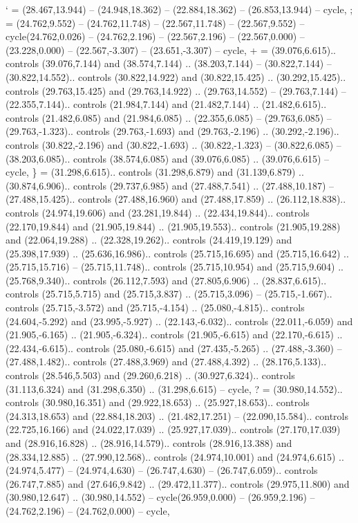 {`} = {(28.467,13.944) -- (24.948,18.362) -- (22.884,18.362) -- (26.853,13.944) -- cycle},
{;} = {(24.762,9.552) -- (24.762,11.748) -- (22.567,11.748) -- (22.567,9.552) -- cycle(24.762,0.026) -- (24.762,2.196) -- (22.567,2.196) -- (22.567,0.000) -- (23.228,0.000) -- (22.567,-3.307) -- (23.651,-3.307) -- cycle},
{+} = {(39.076,6.615).. controls (39.076,7.144) and (38.574,7.144) .. (38.203,7.144) -- (30.822,7.144) -- (30.822,14.552).. controls (30.822,14.922) and (30.822,15.425) .. (30.292,15.425).. controls (29.763,15.425) and (29.763,14.922) .. (29.763,14.552) -- (29.763,7.144) -- (22.355,7.144).. controls (21.984,7.144) and (21.482,7.144) .. (21.482,6.615).. controls (21.482,6.085) and (21.984,6.085) .. (22.355,6.085) -- (29.763,6.085) -- (29.763,-1.323).. controls (29.763,-1.693) and (29.763,-2.196) .. (30.292,-2.196).. controls (30.822,-2.196) and (30.822,-1.693) .. (30.822,-1.323) -- (30.822,6.085) -- (38.203,6.085).. controls (38.574,6.085) and (39.076,6.085) .. (39.076,6.615) -- cycle},
{\}} = {(31.298,6.615).. controls (31.298,6.879) and (31.139,6.879) .. (30.874,6.906).. controls (29.737,6.985) and (27.488,7.541) .. (27.488,10.187) -- (27.488,15.425).. controls (27.488,16.960) and (27.488,17.859) .. (26.112,18.838).. controls (24.974,19.606) and (23.281,19.844) .. (22.434,19.844).. controls (22.170,19.844) and (21.905,19.844) .. (21.905,19.553).. controls (21.905,19.288) and (22.064,19.288) .. (22.328,19.262).. controls (24.419,19.129) and (25.398,17.939) .. (25.636,16.986).. controls (25.715,16.695) and (25.715,16.642) .. (25.715,15.716) -- (25.715,11.748).. controls (25.715,10.954) and (25.715,9.604) .. (25.768,9.340).. controls (26.112,7.593) and (27.805,6.906) .. (28.837,6.615).. controls (25.715,5.715) and (25.715,3.837) .. (25.715,3.096) -- (25.715,-1.667).. controls (25.715,-3.572) and (25.715,-4.154) .. (25.080,-4.815).. controls (24.604,-5.292) and (23.995,-5.927) .. (22.143,-6.032).. controls (22.011,-6.059) and (21.905,-6.165) .. (21.905,-6.324).. controls (21.905,-6.615) and (22.170,-6.615) .. (22.434,-6.615).. controls (25.080,-6.615) and (27.435,-5.265) .. (27.488,-3.360) -- (27.488,1.482).. controls (27.488,3.969) and (27.488,4.392) .. (28.176,5.133).. controls (28.546,5.503) and (29.260,6.218) .. (30.927,6.324).. controls (31.113,6.324) and (31.298,6.350) .. (31.298,6.615) -- cycle},
{?} = {(30.980,14.552).. controls (30.980,16.351) and (29.922,18.653) .. (25.927,18.653).. controls (24.313,18.653) and (22.884,18.203) .. (21.482,17.251) -- (22.090,15.584).. controls (22.725,16.166) and (24.022,17.039) .. (25.927,17.039).. controls (27.170,17.039) and (28.916,16.828) .. (28.916,14.579).. controls (28.916,13.388) and (28.334,12.885) .. (27.990,12.568).. controls (24.974,10.001) and (24.974,6.615) .. (24.974,5.477) -- (24.974,4.630) -- (26.747,4.630) -- (26.747,6.059).. controls (26.747,7.885) and (27.646,9.842) .. (29.472,11.377).. controls (29.975,11.800) and (30.980,12.647) .. (30.980,14.552) -- cycle(26.959,0.000) -- (26.959,2.196) -- (24.762,2.196) -- (24.762,0.000) -- cycle},
